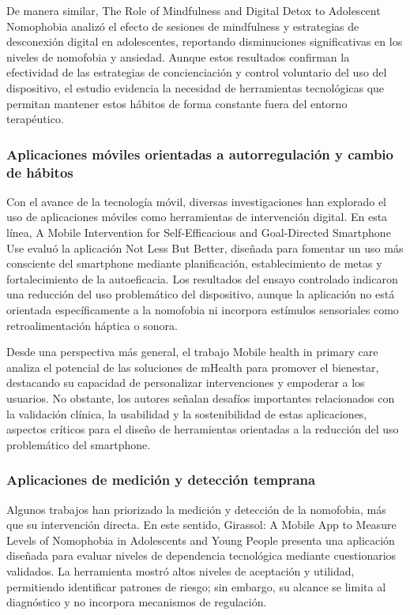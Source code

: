 De manera similar, The Role of Mindfulness and Digital Detox to Adolescent Nomophobia \cite{AiniBukhoriBakar2021} analizó el efecto de sesiones de mindfulness y estrategias de desconexión digital en adolescentes, reportando disminuciones significativas en los niveles de nomofobia y ansiedad. Aunque estos resultados confirman la efectividad de las estrategias de concienciación y control voluntario del uso del dispositivo, el estudio evidencia la necesidad de herramientas tecnológicas que permitan mantener estos hábitos de forma constante fuera del entorno terapéutico.

\subsubsection{Aplicaciones móviles orientadas a autorregulación y cambio de hábitos}

Con el avance de la tecnología móvil, diversas investigaciones han explorado el uso de aplicaciones móviles como herramientas de intervención digital. En esta línea, A Mobile Intervention for Self-Efficacious and Goal-Directed Smartphone Use \cite{Keller2021} evaluó la aplicación Not Less But Better, diseñada para fomentar un uso más consciente del smartphone mediante planificación, establecimiento de metas y fortalecimiento de la autoeficacia. Los resultados del ensayo controlado indicaron una reducción del uso problemático del dispositivo, aunque la aplicación no está orientada específicamente a la nomofobia ni incorpora estímulos sensoriales como retroalimentación háptica o sonora.

Desde una perspectiva más general, el trabajo Mobile health in primary care \cite{ALOS2024102900} analiza el potencial de las soluciones de mHealth para promover el bienestar, destacando su capacidad de personalizar intervenciones y empoderar a los usuarios. No obstante, los autores señalan desafíos importantes relacionados con la validación clínica, la usabilidad y la sostenibilidad de estas aplicaciones, aspectos críticos para el diseño de herramientas orientadas a la reducción del uso problemático del smartphone.

\subsubsection{Aplicaciones de medición y detección temprana}

Algunos trabajos han priorizado la medición y detección de la nomofobia, más que su intervención directa. En este sentido, Girassol: A Mobile App to Measure Levels of Nomophobia in Adolescents and Young People \cite{CunhaSouzaSantiago2020} presenta una aplicación diseñada para evaluar niveles de dependencia tecnológica mediante cuestionarios validados. La herramienta mostró altos niveles de aceptación y utilidad, permitiendo identificar patrones de riesgo; sin embargo, su alcance se limita al diagnóstico y no incorpora mecanismos de regulación.

